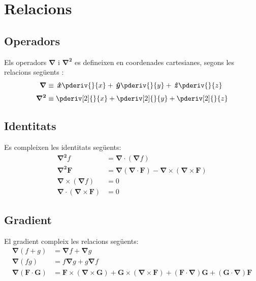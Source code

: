 \documentclass[catalan,a4paper,twoside,11pt]{article}
\begin{document}
\section{Relacions}

\subsection{Operadors}
\renewcommand{\va}{\ensuremath{\,\boldsymbol{\hat{x}}}}
\renewcommand{\vb}{\ensuremath{\,\boldsymbol{\hat{y}}}}
\renewcommand{\vc}{\ensuremath{\,\boldsymbol{\hat{z}}}}
Els operadors $\boldsymbol{\nabla}$ i $\boldsymbol{\nabla^2}$ es defineixen en coordenades cartesianes, segons les relacions seg\"{u}ents :
\begin{align}
    \boldsymbol{\nabla} &\equiv \va \pderiv{}{x} + \vb \pderiv{}{y}
    + \vc \pderiv{}{z}\\[0.5ex]
    \boldsymbol{\nabla^2} &\equiv \pderiv[2]{}{x} + \pderiv[2]{}{y}+ \pderiv[2]{}{z}
\end{align}

\subsection{Identitats}
Es compleixen les identitats seg\"{u}ents:
\begin{align}
    \boldsymbol{\nabla^2}f &=\boldsymbol{\nabla\cdot}(\boldsymbol{\nabla}f)\\
    \boldsymbol{\nabla^2 F}  &= \boldsymbol{\nabla}(\boldsymbol{\nabla\cdot F})
    - \boldsymbol{\nabla\times}(\boldsymbol{\nabla\times F})\\
    \boldsymbol{\nabla\times}(\boldsymbol{\nabla}f) &= 0\\
    \boldsymbol{\nabla\cdot}(\boldsymbol{\nabla\times F}) &= 0
\end{align}

\subsection{Gradient}
El gradient compleix les relacions seg\"{u}ents:
\begin{align}
    \boldsymbol{\nabla}(f+g) &= \boldsymbol{\nabla}f + \boldsymbol{\nabla}g\\
    \boldsymbol{\nabla}(fg) &= f \boldsymbol{\nabla}g + g \boldsymbol{\nabla} f\\
    \boldsymbol{\nabla}(\boldsymbol{F\cdot G}) &=
    \boldsymbol{F\times}(\boldsymbol{\nabla\times G}) + \boldsymbol{G\times}(\boldsymbol{\nabla\times F}) +
    (\boldsymbol{F\cdot\nabla})\boldsymbol{G} + (\boldsymbol{G\cdot\nabla})\boldsymbol{F}
\end{align}
\end{document}
